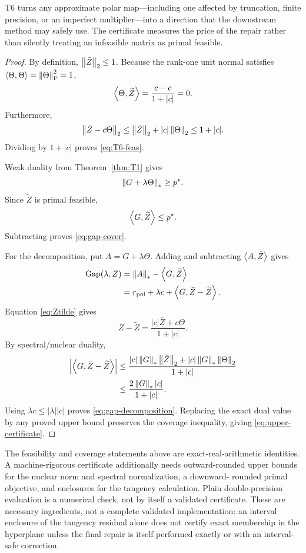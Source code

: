 \begin{intuition}
T6 turns any approximate polar map---including one affected by truncation,
finite precision, or an imperfect multiplier---into a direction that the
downstream method may safely use.  The certificate measures the price of the
repair rather than silently treating an infeasible matrix as primal feasible.
\end{intuition}

\begin{proof}
By definition, \(\left\lVert \bar Z\right\rVert_{2}\le1\).  Because the rank-one unit normal
satisfies \(\left\langle \Theta,\Theta\right\rangle=\left\lVert \Theta\right\rVert_{\mathrm F}^2=1\),
\[
\left\langle \Theta,\widetilde Z\right\rangle
=
\frac{c-c}{1+|c|}
=0.
\]
Furthermore,
\[
\left\lVert \bar Z-c\Theta\right\rVert_{2}
\le
\left\lVert \bar Z\right\rVert_{2}+|c|\left\lVert \Theta\right\rVert_{2}
\le1+|c|.
\]
Dividing by \(1+|c|\) proves \eqref{eq:T6-feas}.

Weak duality from Theorem~\ref{thm:T1} gives
\[
\left\lVert G+\lambda\Theta\right\rVert_{*}\ge p^\star.
\]
Since \(\widetilde Z\) is primal feasible,
\[
\left\langle G,\widetilde Z\right\rangle\le p^\star.
\]
Subtracting proves \eqref{eq:gap-cover}.

For the decomposition, put \(A=G+\lambda\Theta\).  Adding and subtracting
\(\left\langle A,\bar Z\right\rangle\) gives
\[
\begin{aligned}
\operatorname{Gap}(\lambda,Z)
&=
\left\lVert A\right\rVert_{*}-\left\langle G,\widetilde Z\right\rangle\\
&=
r_{\mathrm{pol}}
+\lambda c
+\left\langle G,\bar Z-\widetilde Z\right\rangle.
\end{aligned}
\]
Equation \eqref{eq:Ztilde} gives
\[
\bar Z-\widetilde Z
=
\frac{|c|\bar Z+c\Theta}{1+|c|}.
\]
By spectral/nuclear duality,
\[
\begin{aligned}
\left|\left\langle G,\bar Z-\widetilde Z\right\rangle\right|
&\le
\frac{|c|\left\lVert G\right\rVert_{*}\left\lVert \bar Z\right\rVert_{2}
      +|c|\left\lVert G\right\rVert_{*}\left\lVert \Theta\right\rVert_{2}}
     {1+|c|}\\
&\le
\frac{2\left\lVert G\right\rVert_{*}|c|}{1+|c|}.
\end{aligned}
\]
Using \(\lambda c\le|\lambda||c|\) proves
\eqref{eq:gap-decomposition}.  Replacing the exact dual value by any proved
upper bound preserves the coverage inequality, giving
\eqref{eq:upper-certificate}.
\end{proof}

\begin{boundary}
The feasibility and coverage statements above are exact-real-arithmetic
identities.  A machine-rigorous certificate additionally needs outward-rounded
upper bounds for the nuclear norm and spectral normalization, a downward-
rounded primal objective, and enclosures for the tangency calculation.  Plain
double-precision evaluation is a numerical check, not by itself a validated
certificate.  These are necessary ingredients, not a complete validated
implementation: an interval enclosure of the tangency residual alone does
not certify exact membership in the hyperplane unless the final repair is
itself performed exactly or with an interval-safe correction.
\end{boundary}

